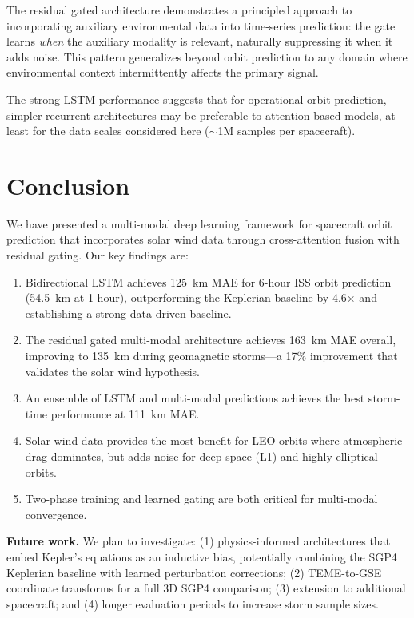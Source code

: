 \documentclass[twocolumn]{article}
\begin{document}
The residual gated architecture demonstrates a principled approach to
incorporating auxiliary environmental data into time-series prediction:
the gate learns \emph{when} the auxiliary modality is relevant, naturally
suppressing it when it adds noise. This pattern generalizes beyond orbit
prediction to any domain where environmental context intermittently
affects the primary signal.

The strong LSTM performance suggests that for operational orbit prediction,
simpler recurrent architectures may be preferable to attention-based models,
at least for the data scales considered here ($\sim$1M samples per spacecraft).

\section{Conclusion}
\label{sec:conclusion}

We have presented a multi-modal deep learning framework for spacecraft
orbit prediction that incorporates solar wind data through cross-attention
fusion with residual gating. Our key findings are:

\begin{enumerate}
  \item Bidirectional LSTM achieves 125~km MAE for 6-hour ISS orbit
    prediction (54.5~km at 1 hour), outperforming the Keplerian baseline
    by 4.6$\times$ and establishing a strong data-driven baseline.
  \item The residual gated multi-modal architecture achieves 163~km MAE
    overall, improving to 135~km during geomagnetic storms---a 17\%
    improvement that validates the solar wind hypothesis.
  \item An ensemble of LSTM and multi-modal predictions achieves the
    best storm-time performance at 111~km MAE.
  \item Solar wind data provides the most benefit for LEO orbits where
    atmospheric drag dominates, but adds noise for deep-space (L1) and
    highly elliptical orbits.
  \item Two-phase training and learned gating are both critical for
    multi-modal convergence.
\end{enumerate}

\textbf{Future work.} We plan to investigate: (1) physics-informed
architectures that embed Kepler's equations as an inductive bias,
potentially combining the SGP4 Keplerian baseline with learned
perturbation corrections; (2) TEME-to-GSE coordinate transforms
for a full 3D SGP4 comparison; (3) extension to additional spacecraft;
and (4) longer evaluation periods to increase storm sample sizes.
\end{document}
